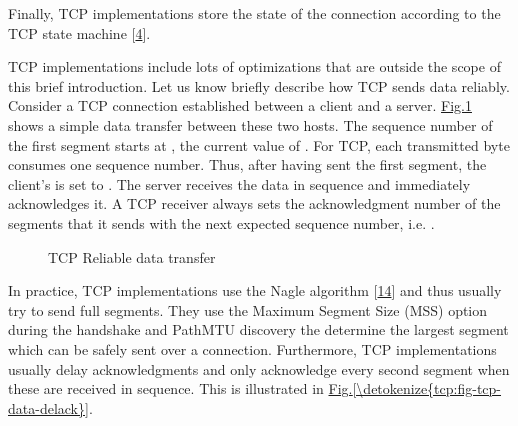 \documentclass[letterpaper,10pt,english]{sphinxmanual}
\begin{document}
\sphinxAtStartPar
Finally, TCP implementations store the state of the connection according to the TCP state machine {[}\hyperlink{cite.biblio:id729}{4}{]}.

\sphinxAtStartPar
TCP implementations include lots of optimizations that are outside the scope of this brief introduction. Let us know briefly describe how TCP sends data reliably. Consider a TCP connection established between a client and a server. \hyperref[\detokenize{tcp:fig-tcp-simple-data}]{Fig.\@ \ref{\detokenize{tcp:fig-tcp-simple-data}}} shows a simple data transfer between these two hosts. The sequence number of the first segment starts at , the current value of . For TCP, each transmitted byte consumes one sequence number. Thus, after having sent the first segment, the client’s  is set to .  The server receives the data in sequence and immediately acknowledges it. A TCP receiver always sets the acknowledgment number of the segments that it sends with the next expected sequence number, i.e. .
\begin{figure}[htbp]\centering\capstart{}\caption{TCP Reliable data transfer}\label{\detokenize{tcp:id7}}\label{\detokenize{tcp:fig-tcp-simple-data}}\end{figure}
\sphinxAtStartPar
In practice, TCP implementations use the Nagle algorithm {[}\hyperlink{cite.biblio:id831}{14}{]} and thus usually try to send full segments. They use the Maximum Segment Size (MSS) option during the handshake and PathMTU discovery the determine the largest segment which can be safely sent over a connection. Furthermore, TCP implementations usually delay acknowledgments and only acknowledge every second segment when these are received in sequence. This is illustrated in \hyperref[\detokenize{tcp:fig-tcp-data-delack}]{Fig.\@ \ref{\detokenize{tcp:fig-tcp-data-delack}}}.
\end{document}
